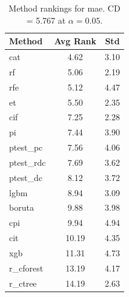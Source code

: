 \begin{table}[h]
\centering
\caption{Method rankings for mae. CD = 5.767 at $\alpha=0.05$.}
\label{tab:ranks_mae}
\begin{tabular}{lcc}
\toprule
Method & Avg Rank & Std \\
\midrule
cat & 4.62 & 3.10 \\
rf & 5.06 & 2.19 \\
rfe & 5.12 & 4.47 \\
et & 5.50 & 2.35 \\
cif & 7.25 & 2.28 \\
pi & 7.44 & 3.90 \\
ptest_pc & 7.56 & 4.06 \\
ptest_rdc & 7.69 & 3.62 \\
ptest_dc & 8.12 & 3.72 \\
lgbm & 8.94 & 3.09 \\
boruta & 9.88 & 3.98 \\
cpi & 9.94 & 4.94 \\
cit & 10.19 & 4.35 \\
xgb & 11.31 & 4.73 \\
r_cforest & 13.19 & 4.17 \\
r_ctree & 14.19 & 2.63 \\
\bottomrule
\end{tabular}
\end{table}